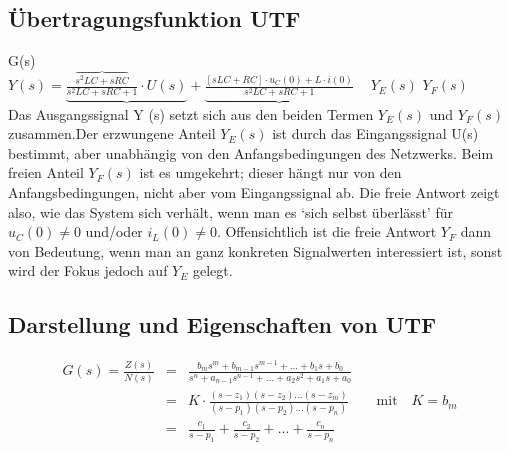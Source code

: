 \subsection{Übertragungsfunktion UTF }
\hspace{2.3cm}G(s)\\
$Y(s) = \underbrace{\frac{\overbrace{s^2 LC+sRC}}{s^2 LC +sRC +1}\cdot U(s)} + \underbrace{\frac{[sLC + RC] \cdot u_{C}(0) + L \cdot i(0)}{s^2 LC +sRC +1}}$ \newline
\textcolor{white}{x} \hspace{2.4cm} $Y_{E}(s)$ \hspace{3.8cm} $Y_{F}(s)$ \\
Das Ausgangssignal Y (s) setzt sich aus den beiden Termen $Y_{E}(s)$ und $Y_{F}(s)$ zusammen.Der erzwungene Anteil $Y_{E}(s)$ ist durch das Eingangssignal U(s) bestimmt, aber unabhängig von den Anfangsbedingungen des Netzwerks.
Beim freien Anteil $Y_{F}(s)$ ist es umgekehrt; dieser hängt nur von den Anfangsbedingungen,
nicht aber vom Eingangssignal ab. Die freie Antwort zeigt also, wie
das System sich verhält, wenn man es ‘sich selbst überlässt’
für $u_{C}(0) \neq 0$ und/oder $i_{L}(0) \neq 0$.
Offensichtlich ist die freie Antwort $Y_{F}$ dann von Bedeutung, wenn man an ganz konkreten
Signalwerten interessiert ist, sonst wird der Fokus jedoch auf $Y_{E}$ gelegt. \\

\subsection{Darstellung und Eigenschaften von UTF }

\begin{eqnarray}
G(s)=\frac{Z(s)}{N(s)}& = &\frac{b_{m}s^m + b_{m-1}s^{m-1}+ ... + b_{1}s+b_{0}}{s^{n}+a_{n-1}s^{n-1} + ... + a_{2}s^{2}+a_{1}s + a_{0}} \\ 
& = & K\cdot \frac{(s-z_{1})(s-z_{2})...(s-z_{m})}{(s-p_{1})(s-p_{2})...(s-p_{n})} \qquad \text{mit} \quad K=b_{m} \\ 
& = & \frac{c_{1}}{s-p_{1}} + \frac{c_{2}}{s-p_{2}} + ...  + \frac{c_{n}}{s-p_{n}}
\end{eqnarray}


